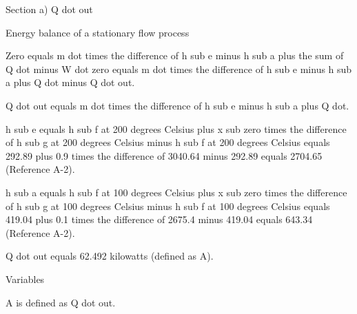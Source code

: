 Section a) Q dot out

Energy balance of a stationary flow process

Zero equals m dot times the difference of h sub e minus h sub a plus the sum of Q dot minus W dot zero equals m dot times the difference of h sub e minus h sub a plus Q dot minus Q dot out.

Q dot out equals m dot times the difference of h sub e minus h sub a plus Q dot.

h sub e equals h sub f at 200 degrees Celsius plus x sub zero times the difference of h sub g at 200 degrees Celsius minus h sub f at 200 degrees Celsius equals 292.89 plus 0.9 times the difference of 3040.64 minus 292.89 equals 2704.65 (Reference A-2).

h sub a equals h sub f at 100 degrees Celsius plus x sub zero times the difference of h sub g at 100 degrees Celsius minus h sub f at 100 degrees Celsius equals 419.04 plus 0.1 times the difference of 2675.4 minus 419.04 equals 643.34 (Reference A-2).

Q dot out equals 62.492 kilowatts (defined as A).

Variables

A is defined as Q dot out.